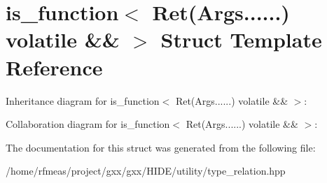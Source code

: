 \hypertarget{structis__function_3_01Ret_07Args_8_8_8_8_8_8_08_01volatile_01_6_6_01_4}{}\section{is\+\_\+function$<$ Ret(Args......) volatile \&\& $>$ Struct Template Reference}
\label{structis__function_3_01Ret_07Args_8_8_8_8_8_8_08_01volatile_01_6_6_01_4}


Inheritance diagram for is\+\_\+function$<$ Ret(Args......) volatile \&\& $>$\+:


Collaboration diagram for is\+\_\+function$<$ Ret(Args......) volatile \&\& $>$\+:


The documentation for this struct was generated from the following file\+:\begin{DoxyCompactItemize}
\item 
/home/rfmeas/project/gxx/gxx/\+H\+I\+D\+E/utility/type\+\_\+relation.\+hpp\end{DoxyCompactItemize}
